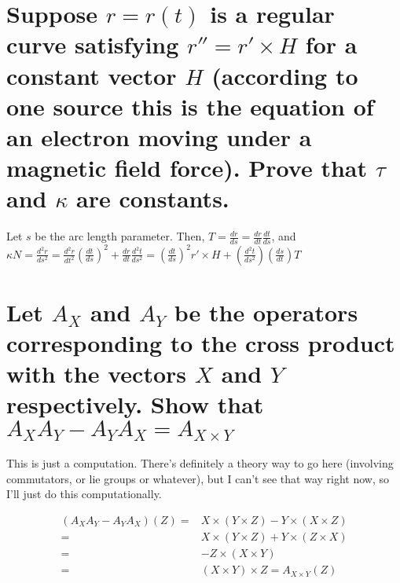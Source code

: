 \documentclass[12pt]{amsart}
\begin{document}
\section{Suppose $r=r(t)$ is a regular curve satisfying $r''=r'\times H$ for a constant vector $H$ (according to one source this is the equation of an electron moving under a magnetic field force). Prove that $\tau$ and $\kappa$ are constants.}
Let $s$ be the arc length parameter. Then, $T=\frac{dr}{ds}=\frac{dr}{dt}\frac{dt}{ds}$, and $\kappa N=\frac{d^2r}{ds^2}=\frac{d^2r}{dt^2}\left(\frac{dt}{ds}\right)^2+\frac{dr}{dt}\frac{d^2t}{ds^2}=\left(\frac{dt}{ds}\right)^2r'\times H+\left(\frac{d^2t}{ds^2}\right)\left(\frac{ds}{dt}\right)T$

\section{Let $A_X$ and $A_Y$ be the operators corresponding to the cross product with the vectors $X$ and $Y$ respectively. Show that $A_XA_Y-A_YA_X=A_{X\times Y}$}
This is just a computation. There's definitely a theory way to go here (involving commutators, or lie groups or whatever), but I can't see that way right now, so I'll just do this computationally.
\begin{comment}\begin{align*}
	\left(A_xA_y-A_yA_x\right)(z)=&x\times(y\times z)-y\times(x\times z)
	\\=&x\times\left((y_2z_3-y_3z_2)i-(y_1z_3-y_3z_1)j+(y_2z_3-y_3z_2)k \right)
	\\&- y\times\left((x_2z_3-x_3z_2)i-(x_1z_3-x_3z_1)j+(x_2z_3-x_3z_2)k \right)
	\\=&(x_2y_2z_3-x_2y_3z_2+x_3y_1z_3-x_3y_3z_1)i
	\\&-(x_1y_2z_3-x_1y_3z_2-x_3y_2z_3+x_3y_3z_2)j
	\\&+
\end{align*}
\end{comment}
\begin{align*}
	(A_XA_Y-A_YA_X)(Z)=&X\times (Y\times Z)-Y\times(X\times Z)
	\\=&X\times(Y\times Z)+Y\times(Z\times X)
	\\=&-Z\times(X\times Y)
	\\=&(X\times Y)\times Z=A_{X\times Y}(Z)
\end{align*}
\end{document}
